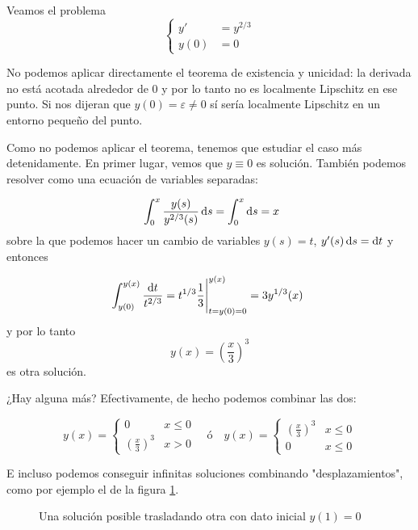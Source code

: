 \begin{example}
Veamos el problema \[ \begin{cases} y' &= y^{2/3} \\ y(0) &= 0 \end{cases} \]

No podemos aplicar directamente el teorema de existencia y unicidad: la derivada no está acotada alrededor de 0 y por lo tanto no es localmente Lipschitz en ese punto. Si nos dijeran que $y(0) = ε ≠ 0$ sí sería localmente Lipschitz en un entorno pequeño del punto.

Como no podemos aplicar el teorema, tenemos que estudiar el caso más detenidamente. En primer lugar, vemos que $y\equiv 0$ es solución. También podemos resolver como una ecuación de variables separadas:

\[ \int_0^x \frac{y(s)}{y^{2/3}(s)} \dif s = \int_0^x \dif s = x \] sobre la que podemos hacer un cambio de variables $y(s) = t$, $y'(s) \dif s = \dif t$ y entonces

\[ \int_{y(0)}^{y(x)} \frac{\dif t}{t^{2/3}} = \eval{t^{1/3}{\frac{1}{3}}}_{t=y(0)=0}^{y(x)} = 3y^{1/3}(x) 
\] 
y por lo tanto \[ y(x) = \left(\frac{x}{3}\right)^3 \] es otra solución.

¿Hay alguna más? Efectivamente, de hecho podemos combinar las dos:

\[ y(x) = \begin{cases}
0 & x ≤ 0 \\
\left(\frac{x}{3}\right)^3 & x > 0
\end{cases}\quad \text{\'o} \quad y(x) = \begin{cases}
\left(\frac{x}{3}\right)^3 & x ≤ 0 \\
0 & x ≤ 0\end{cases} \]

E incluso podemos conseguir infinitas soluciones combinando "desplazamientos", como por ejemplo el de la figura \ref{imgInfSoluciones}.
\end{example}

\begin{figure}[hbtp]
\centering
{}
\label{imgInfSoluciones}
\caption{Una solución posible trasladando otra con dato inicial $y(1) = 0$}
\end{figure}


